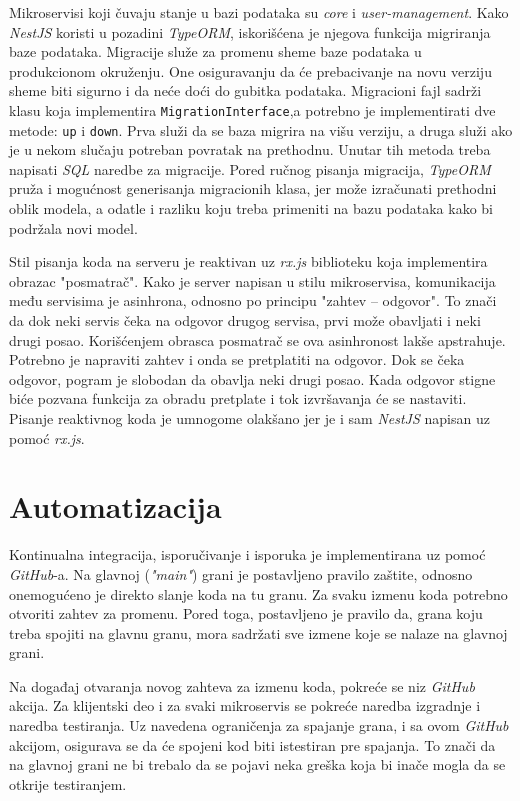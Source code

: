 Mikroservisi koji čuvaju stanje u bazi podataka su \textit{core} i 
\textit{user-management}. Kako \textit{NestJS} koristi u pozadini \textit{TypeORM}, 
iskorišćena je njegova funkcija migriranja baze podataka. Migracije služe 
za promenu sheme baze podataka u produkcionom okruženju. One osiguravanju da 
će prebacivanje na novu verziju sheme biti sigurno i da neće doći do gubitka 
podataka. Migracioni fajl sadrži klasu koja implementira 
\texttt{MigrationInterface},a potrebno je implementirati dve metode: 
\texttt{up} i \texttt{down}. Prva služi da se baza migrira na višu 
verziju, a druga služi ako je u nekom slučaju potreban povratak na prethodnu. 
Unutar tih metoda treba napisati \textit{SQL} naredbe za migracije. Pored 
ručnog pisanja migracija, \textit{TypeORM} pruža i mogućnost generisanja 
migracionih klasa, jer može izračunati prethodni oblik modela, a odatle i 
razliku koju treba primeniti na bazu podataka kako bi podržala novi model. 

Stil pisanja koda na serveru je reaktivan uz \textit{rx.js} biblioteku koja
implementira obrazac "posmatrač". Kako je server napisan u stilu mikroservisa,
komunikacija među servisima je asinhrona, odnosno po principu 
"zahtev -- odgovor". To znači da dok neki servis čeka na odgovor drugog 
servisa, prvi može obavljati i neki drugi posao. Korišćenjem obrasca 
posmatrač se ova asinhronost lakše apstrahuje. Potrebno je napraviti zahtev 
i onda se pretplatiti na odgovor. Dok se čeka odgovor, pogram je slobodan da 
obavlja neki drugi posao. Kada odgovor stigne biće pozvana funkcija 
za obradu pretplate i tok izvršavanja će se nastaviti.
Pisanje reaktivnog koda je umnogome olakšano jer je i sam \textit{NestJS} 
napisan uz pomoć \textit{rx.js}. 

\section{Automatizacija}
Kontinualna integracija, isporučivanje i isporuka je implementirana uz 
pomoć \textit{GitHub}-a. Na glavnoj (\textit{"main"}) grani 
je postavljeno pravilo zaštite, odnosno onemogućeno je direkto slanje 
koda na tu granu. Za svaku izmenu koda potrebno otvoriti zahtev za 
promenu. Pored toga, postavljeno je pravilo da, grana koju treba spojiti 
na glavnu granu, mora sadržati sve izmene koje se nalaze na glavnoj grani.

Na događaj otvaranja novog zahteva za izmenu koda, pokreće se niz 
\textit{GitHub} akcija. Za klijentski deo i za svaki mikroservis 
se pokreće naredba izgradnje i naredba testiranja. Uz navedena 
ograničenja za spajanje grana, i sa ovom \textit{GitHub} akcijom, 
osigurava se da će spojeni kod biti istestiran pre spajanja. To znači da 
na glavnoj grani ne bi trebalo da se pojavi neka greška koja bi inače mogla 
da se otkrije testiranjem.

